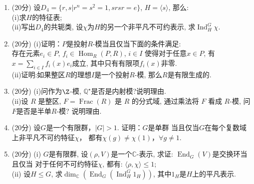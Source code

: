 
\begin{center}
\end{center}
\begin{enumerate}
\item (20分)
设$D_4 = \{ r,s| r^n = s^2 = 1, srsr = e\}$, $H = \langle s \rangle$, 那么:\\
(i)求$H$的特征表;\\
(ii)写出$D_4$的共轭类, 设$\chi$为$H$的另一个非平凡不可约表示, 求$\operatorname{Ind}_H^G \chi$.

\item (20分)
(i)证明：$P$是投射$R$-模当且仅当下面的条件满足:\\
    存在元素$e_i\in P$, $f_i\in \operatorname{Hom}_R(P,R)$, $i\in I$
    使得对于任意$x\in P$, 有$x=\sum\limits_{i\in I}f_i(x)e_i$成立, 
    其中只有有限项$f_i(x)$非零.\\
(ii)证明:如果整区$R$的理想$I$是一个投射$R$-模, 那么$R$是有限生成的.

\item (20分)
(i)问作为$\Z$-模, $\mathbb{Q}^{\star}$是否是内射模?说明理由.\\
(ii)设 $R$ 是整区, $F=\operatorname{Frac}(R)$ 是 $R$ 的分式域, 
通过乘法将 $F$ 看成 $R$-模, 问$F$是否是半单$R$-模? 说明理由.

\item (20分)
设$G$是一个有限群，$|G|>1$. 证明：$G$是单群
当且仅当$G$在每个复数域上非平凡不可约特征$\chi$，
都有$\chi(g)\ne\chi(1)$，$\forall g\ne1$.

\item (20分)
(i) $G$是有限群, 设$(\rho, V)$是一个$\mathbb{C}$-表示, 
求证: $\operatorname{End}_G(V)$是交换环当且仅当
对于任何不可约特征$\chi$, 都有: $\langle \rho, \chi \rangle \leq 1$;\\
(ii) 设$H \leq G$, 求$\dim_{\mathbb{C}}(\operatorname{End}_G(\operatorname{Ind}_H^G 1_H))$, 其中$1_H$是$H$上的平凡表示.
\end{enumerate}

